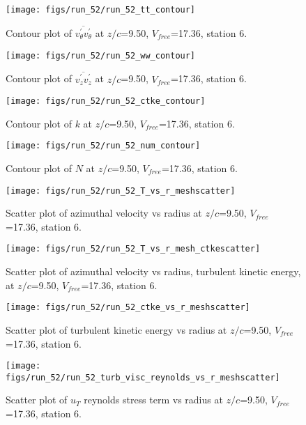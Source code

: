 \begin{figure}[H]
\centering
\texttt{[image: figs/run\_52/run\_52\_tt\_contour]}
\caption{Contour plot of $\overline{v_{\theta}^{\prime} v_{\theta}^{\prime}}$ at $z/c$=9.50, $V_{free}$=17.36, station 6.}
\end{figure}


\begin{figure}[H]
\centering
\texttt{[image: figs/run\_52/run\_52\_ww\_contour]}
\caption{Contour plot of $\overline{v_{z}^{\prime} v_{z}^{\prime}}$ at $z/c$=9.50, $V_{free}$=17.36, station 6.}
\end{figure}


\begin{figure}[H]
\centering
\texttt{[image: figs/run\_52/run\_52\_ctke\_contour]}
\caption{Contour plot of $k$ at $z/c$=9.50, $V_{free}$=17.36, station 6.}
\end{figure}


\begin{figure}[H]
\centering
\texttt{[image: figs/run\_52/run\_52\_num\_contour]}
\caption{Contour plot of $N$ at $z/c$=9.50, $V_{free}$=17.36, station 6.}
\end{figure}


\begin{figure}[H]
\centering
\texttt{[image: figs/run\_52/run\_52\_T\_vs\_r\_meshscatter]}
\caption{Scatter plot of azimuthal velocity vs radius at $z/c$=9.50, $V_{free}$=17.36, station 6.}
\end{figure}


\begin{figure}[H]
\centering
\texttt{[image: figs/run\_52/run\_52\_T\_vs\_r\_mesh\_ctkescatter]}
\caption{Scatter plot of azimuthal velocity vs radius, turbulent kinetic energy, at $z/c$=9.50, $V_{free}$=17.36, station 6.}
\end{figure}


\begin{figure}[H]
\centering
\texttt{[image: figs/run\_52/run\_52\_ctke\_vs\_r\_meshscatter]}
\caption{Scatter plot of turbulent kinetic energy vs radius at $z/c$=9.50, $V_{free}$=17.36, station 6.}
\end{figure}


\begin{figure}[H]
\centering
\texttt{[image: figs/run\_52/run\_52\_turb\_visc\_reynolds\_vs\_r\_meshscatter]}
\caption{Scatter plot of $
u_T$ reynolds stress term vs radius at $z/c$=9.50, $V_{free}$=17.36, station 6.}
\end{figure}


